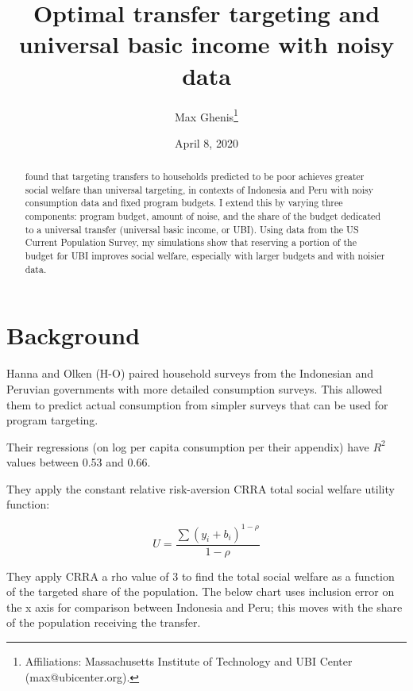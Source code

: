 \documentclass[12pt]{article}
\begin{document}
\begin{titlepage}
\title{Optimal transfer targeting and universal basic income with noisy data}
\author{Max Ghenis\thanks{Affiliations: Massachusetts Institute of Technology and UBI Center (max@ubicenter.org).
}}

\date{April 8, 2020}
\maketitle
\begin{abstract}
\noindent \cite{hannaolken} found that targeting transfers to households 
predicted to be poor achieves greater social welfare than universal targeting, 
in contexts of Indonesia and Peru with noisy consumption data and fixed program 
budgets. I extend this by varying three components: program budget, amount of 
noise, and the share of the budget dedicated to a universal transfer (universal 
basic income, or UBI). Using data from the US Current Population Survey, my 
simulations show that reserving a portion of the budget for UBI improves social 
welfare, especially with larger budgets and with noisier data.

\bigskip
\end{abstract}
\setcounter{page}{0}
\thispagestyle{empty}
\end{titlepage}
\pagebreak \newpage




\doublespacing


\section{Background} \label{sec:background}

Hanna and Olken (H-O) paired household surveys from the Indonesian and 
Peruvian governments with more detailed consumption surveys. This allowed them 
to predict actual consumption from simpler surveys that can be used for program 
targeting.

Their regressions (on log per capita consumption per their appendix) have $R^2$ 
values between 0.53 and 0.66.

They apply the constant relative risk-aversion CRRA total social welfare 
utility function:

\begin{equation}
U = \frac{\sum{(y_i + b_i)^{1-\rho}}}{1-\rho}
\end{equation}

They apply CRRA a rho value of 3 to find the total social welfare as a function 
of the targeted share of the population. The below chart uses inclusion error 
on the x axis for comparison between Indonesia and Peru; this moves with the 
share of the population receiving the transfer.
\end{document}
